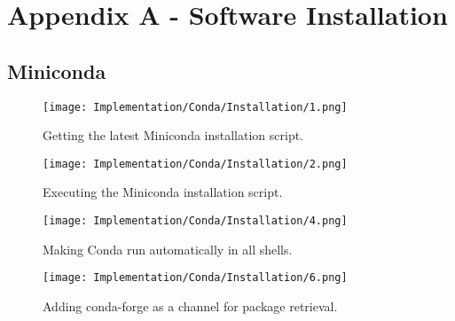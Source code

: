 \begingroup
\renewcommand\thechapter{A}
\titleformat{\chapter}[display]
{\normalfont\huge\bfseries}{}{20pt}{\Huge}
\setcounter{section}{0} %
\setcounter{figure}{0} %

\chapter*{Appendix A - Software Installation}

\section{Miniconda}

\begin{figure}[H]
    \centering
    \texttt{[image: Implementation/Conda/Installation/1.png]}
    \caption{Getting the latest Miniconda installation script.}
    \label{fig:CondaInstall1}
\end{figure}

\begin{figure}[H]
    \centering
    \texttt{[image: Implementation/Conda/Installation/2.png]}
    \caption{Executing the Miniconda installation script.}
    \label{fig:CondaInstall2}
\end{figure}


\begin{figure}[H]
    \centering
    \texttt{[image: Implementation/Conda/Installation/4.png]}
    \caption{Making Conda run automatically in all shells.}
    \label{fig:CondaInstall4}
\end{figure}

\begin{figure}[H]
    \centering
    \texttt{[image: Implementation/Conda/Installation/6.png]}
    \caption{Adding conda-forge as a channel for package retrieval.}
    \label{fig:CondaInstall6}
\end{figure}

